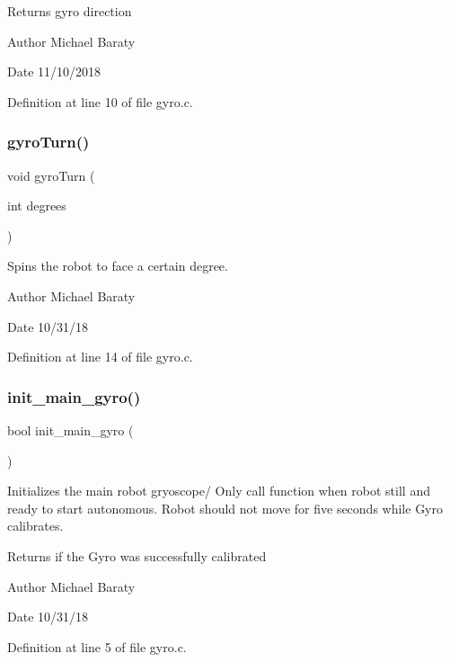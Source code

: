 \begin{DoxyReturn}{Returns}
gyro direction 
\end{DoxyReturn}
\begin{DoxyAuthor}{Author}
Michael Baraty 
\end{DoxyAuthor}
\begin{DoxyDate}{Date}
11/10/2018 
\end{DoxyDate}


Definition at line 10 of file gyro.\+c.

\mbox{\label{gyro_8c_aa109575b53b29cd5bf9c9978423752c0}} 
\subsubsection{gyro\+Turn()}
{\footnotesize\ttfamily void gyro\+Turn (\begin{DoxyParamCaption}\item[{int}]{degrees }\end{DoxyParamCaption})}



Spins the robot to face a certain degree. 

\begin{DoxyAuthor}{Author}
Michael Baraty 
\end{DoxyAuthor}
\begin{DoxyDate}{Date}
10/31/18 
\end{DoxyDate}


Definition at line 14 of file gyro.\+c.

\mbox{\label{gyro_8c_a47c0a78a867be91a28e278bf433d699c}} 
\subsubsection{init\+\_\+main\+\_\+gyro()}
{\footnotesize\ttfamily bool init\+\_\+main\+\_\+gyro (\begin{DoxyParamCaption}{ }\end{DoxyParamCaption})}



Initializes the main robot gryoscope/ Only call function when robot still and ready to start autonomous. Robot should not move for five seconds while Gyro calibrates. 

\begin{DoxyReturn}{Returns}
if the Gyro was successfully calibrated 
\end{DoxyReturn}
\begin{DoxyAuthor}{Author}
Michael Baraty 
\end{DoxyAuthor}
\begin{DoxyDate}{Date}
10/31/18 
\end{DoxyDate}


Definition at line 5 of file gyro.\+c.

